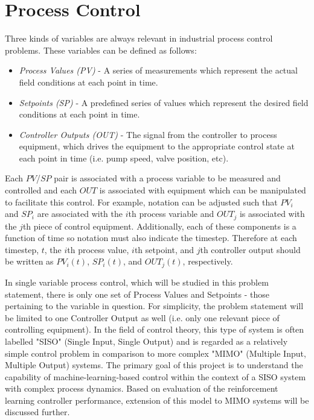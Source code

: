 \documentclass{article}
\begin{document}
\section{Process Control}

Three kinds of variables are always relevant in industrial process control problems.  These variables can be defined as follows:

\begin{itemize}
\item {\em Process Values (PV)} - A series of measurements which represent the actual field conditions at each point in time.
\item {\em Setpoints (SP)} - A predefined series of values which represent the desired field conditions at each point in time.
\item {\em Controller Outputs (OUT)} - The signal from the controller to process equipment, which drives the equipment to the appropriate control state at each point in time (i.e. pump speed, valve position, etc).
\end{itemize}

Each $PV$/$SP$ pair is associated with a process variable to be measured and controlled and each $OUT$ is associated with equipment which can be manipulated to facilitate this control.  For example, notation can be adjusted such that $PV_i$ and $SP_i$ are associated with the $i$th process variable and $OUT_j$ is associated with the $j$th piece of control equipment.  Additionally, each of these components is a function of time so notation must also indicate the timestep.  Therefore at each timestep, $t$, the $i$th process value, $i$th setpoint, and $j$th controller output should be written as $PV_i (t)$, $SP_i (t)$, and $OUT_j (t)$, respectively.

In single variable process control, which will be studied in this problem statement, there is only one set of Process Values and Setpoints - those pertaining to the variable in question.  For simplicity, the problem statement will be limited to one Controller Output as well (i.e. only one relevant piece of controlling equipment).  In the field of control theory, this type of system is often labelled "SISO" (Single Input, Single Output) and is regarded as a relatively simple control problem in comparison to more complex "MIMO" (Multiple Input, Multiple Output) systems.  The primary goal of this project is to understand the capability of machine-learning-based control within the context of a SISO system with complex process dynamics.  Based on evaluation of the reinforcement learning controller performance, extension of this model to MIMO systems will be discussed further.
\end{document}
